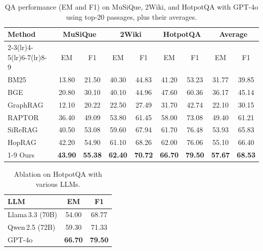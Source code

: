 \documentclass[runningheads]{llncs}
\begin{document}
\begin{table}[t!]
\centering
\label{tab:main_results}
\begin{tabular}{lcccccccc}
\toprule
\multirow{2}{*}{Method} 
 & \multicolumn{2}{c}{MuSiQue} 
 & \multicolumn{2}{c}{2Wiki} 
 & \multicolumn{2}{c}{HotpotQA} 
 & \multicolumn{2}{c}{Average} \\
\cmidrule(lr){2-3}\cmidrule(lr){4-5}\cmidrule(lr){6-7}\cmidrule(lr){8-9}
 & EM & F1 & EM & F1 & EM & F1 & EM & F1 \\
\midrule
BM25    & 13.80 & 21.50 & 40.30 & 44.83 & 41.20 & 53.23 & 31.77 & 39.85 \\
BGE     & 20.80 & 30.10 & 40.10 & 44.96 & 47.60 & 60.36 & 36.17 & 45.14 \\
GraphRAG & 12.10 & 20.22 & 22.50 & 27.49 & 31.70 & 42.74 & 22.10 & 30.15 \\
RAPTOR   & 36.40 & 49.09 & 53.80 & 61.45 & 58.00 & 73.08 & 49.40 & 61.21 \\
SiReRAG  & 40.50 & 53.08 & 59.60 & 67.94 & 61.70 & 76.48 & 53.93 & 65.83 \\
HopRAG   & 42.20 & 54.90 & 61.10 & 68.26 & 62.00 & 76.06 & 55.10 & 66.40 \\
\cmidrule(lr){1-9}
Ours     & \textbf{43.90} & \textbf{55.38} & \textbf{62.40} & \textbf{70.72} & \textbf{66.70} & \textbf{79.50} & \textbf{57.67} & \textbf{68.53} \\
\bottomrule
\end{tabular}
\caption{QA performance (EM and F1) on MuSiQue, 2Wiki, and HotpotQA
with GPT-4o using top-20 passages, plus their averages.}
\end{table}

\begin{table}[t]
    \centering
    \label{tab:llm_ablation}
    \begin{tabular}{lcc}
    \toprule
    \textbf{LLM} & \textbf{EM} & \textbf{F1} \\
    \midrule
    Llama\,3.3 (70B) & 54.00 & 68.77 \\
    Qwen\,2.5 (72B)  & 59.30 & 71.33 \\
    GPT-4o     & \textbf{66.70} & \textbf{79.50} \\
    \bottomrule
    \end{tabular}
    \caption{Ablation on HotpotQA with various LLMs.}
\end{table}
\end{document}
